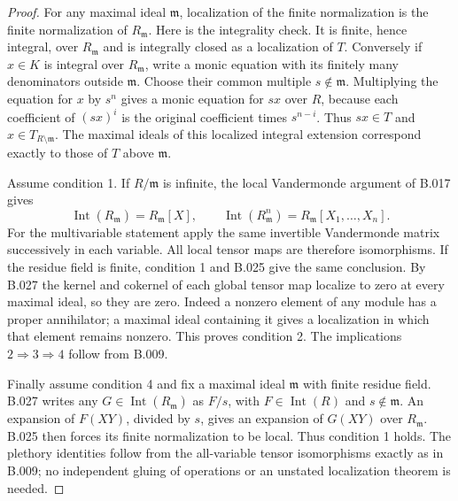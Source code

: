 \begin{proof}
For any maximal ideal $\mathfrak m$, localization of the finite
normalization is the finite normalization of $R_{\mathfrak m}$.
Here is the integrality check. It is finite, hence integral, over
$R_{\mathfrak m}$ and is integrally closed as a localization of
$T$. Conversely if $x\in K$ is integral over $R_{\mathfrak m}$,
write a monic equation with its finitely many denominators outside
$\mathfrak m$. Choose their common multiple $s\notin\mathfrak m$.
Multiplying the equation for $x$ by $s^n$ gives a monic equation
for $sx$ over $R$, because each coefficient of $(sx)^i$ is the
original coefficient times $s^{n-i}$. Thus $sx\in T$ and
$x\in T_{R\setminus\mathfrak m}$. The maximal ideals of this
localized integral extension correspond exactly to those of $T$
above $\mathfrak m$.

Assume condition 1. If $R/\mathfrak m$ is infinite, the local
Vandermonde argument of B.017 gives
\[
 \operatorname{Int}(R_{\mathfrak m})=R_{\mathfrak m}[X],
 \qquad
 \operatorname{Int}(R_{\mathfrak m}^n)
       =R_{\mathfrak m}[X_1,\ldots,X_n].
\]
For the multivariable statement apply the same invertible
Vandermonde matrix successively in each variable. All local
tensor maps are therefore isomorphisms. If the residue field
is finite, condition 1 and B.025 give the same conclusion.
By B.027 the kernel and cokernel of each global tensor map
localize to zero at every maximal ideal, so they are zero.
Indeed a nonzero element of any module has a proper annihilator;
a maximal ideal containing it gives a localization in which
that element remains nonzero. This proves condition 2.
The implications $2\Rightarrow3\Rightarrow4$ follow from B.009.

Finally assume condition 4 and fix a maximal ideal
$\mathfrak m$ with finite residue field. B.027 writes any
$G\in\operatorname{Int}(R_{\mathfrak m})$ as $F/s$, with
$F\in\operatorname{Int}(R)$ and $s\notin\mathfrak m$.
An expansion of $F(XY)$, divided by $s$, gives an expansion of
$G(XY)$ over $R_{\mathfrak m}$. B.025 then forces its finite
normalization to be local. Thus condition 1 holds.
The plethory identities follow from the all-variable tensor
isomorphisms exactly as in B.009; no independent gluing of
operations or an unstated localization theorem is needed.
\end{proof}

